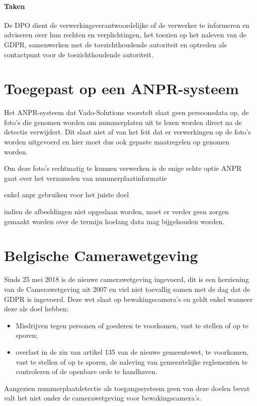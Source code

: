 \paragraph{Taken}
De DPO dient de verwerkingsverantwoordelijke of de verwerker te informeren en adviseren over hun rechten en verplichtingen, het toezien op het naleven van de GDPR, samenwerken met de toezichthoudende autoriteit en optreden als contactpunt voor de toezichthoudende autoriteit.

\section{Toegepast op een ANPR-systeem}
Het ANPR-systeem dat Vado-Solutions voorstelt slaat geen persoonsdata op, de foto's die genomen worden om nummerplaten uit te lezen worden direct na de detectie verwijdert. Dit slaat niet af van het feit dat er verwerkingen op de foto's worden uitgevoerd en hier moet dus ook gepaste maatregelen op genomen worden.

Om deze foto's rechtmatig te kunnen verwerken is de enige echte optie 
ANPR gaat over het verzamelen van nummerplaatinformatie

enkel anpr gebruiken voor het juiste doel

indien de afbeeldingen niet opgeslaan worden, moet er verder geen zorgen gemaakt worden over de termijn hoelang data mag bijgehouden worden.

\section{Belgische Camerawetgeving}
Sinds 25 mei 2018 is de nieuwe camerawetgeving ingevoerd, dit is een herziening van de Camerawetgeving uit 2007 en viel niet toevallig samen met de dag dat de GDPR is ingevoerd. Deze wet slaat op bewakingscamera's en geldt enkel wanneer deze als doel hebben:
\begin{itemize}
	\item Misdrijven tegen personen of goederen te voorkomen, vast te stellen of op te sporen;
	\item overlast in de zin van artikel 135 van de nieuwe gemeentewet, te voorkomen, vast te stellen of op te sporen, de naleving van gemeentelijke reglementen te controleren of de openbare orde te handhaven.
\end{itemize}
Aangezien nummerplaatdetectie als toegangssysteem geen van deze doelen bevat valt het niet onder de camerawetgeving voor bewakingscamera's. \autocite{staatsblad2007wet}

